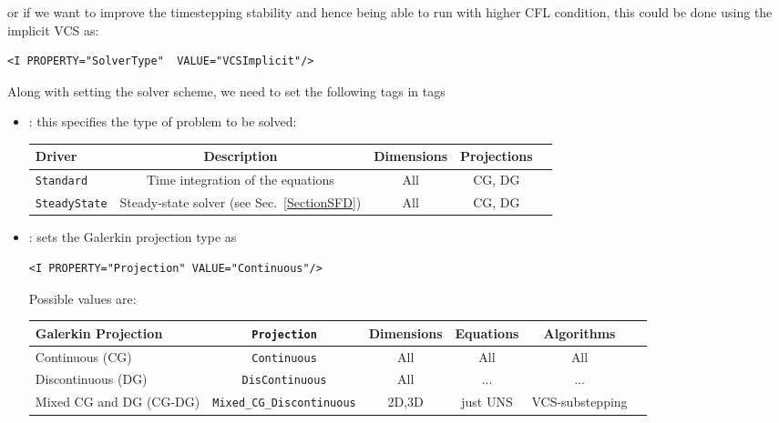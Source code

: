 or if we want to improve the timestepping stability and hence being able to 
run with higher CFL condition, this could be done using the implicit VCS as:

\begin{lstlisting}[style=XMLStyle]
<I PROPERTY="SolverType"  VALUE="VCSImplicit"/>
\end{lstlisting}

Along with setting the solver scheme, we need to set the following tags in 
 tags


\begin{itemize}
\item {}: this specifies the type of problem to be solved:

\begin{center}
\footnotesize
\begin{tabular}{lcccc}
\toprule
{Driver} & {Description} &{Dimensions}&{Projections} \\
\midrule
\texttt{Standard} & Time integration of the equations & All & CG, DG \\
\texttt{SteadyState} & Steady-state solver (see Sec.~\ref{SectionSFD})  & All & CG, DG \\
\bottomrule
\end{tabular}
\end{center}

\item {}: sets the Galerkin projection type as
\begin{lstlisting}[style=XMLStyle]
<I PROPERTY="Projection" VALUE="Continuous"/>
\end{lstlisting}

Possible values are:
\begin{center}
\footnotesize
\begin{tabular}{lccccc}
\toprule
{Galerkin Projection} & \texttt{Projection} &{Dimensions}&{Equations}&{Algorithms} \\
\midrule
Continuous (CG)&  \texttt{Continuous} & All & All & All \\
Discontinuous (DG) & \texttt{DisContinuous} & All &...&...\\
Mixed CG and DG (CG-DG) & \texttt{Mixed\_CG\_Discontinuous} & 2D,3D & just UNS & VCS-substepping \\
\bottomrule
\end{tabular}
\end{center}

\end{itemize}

